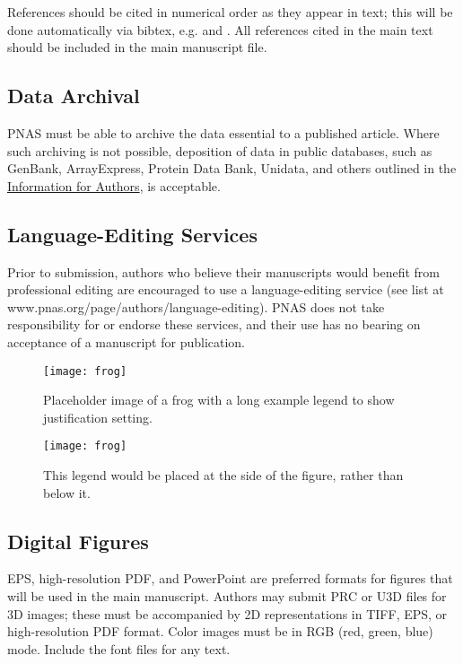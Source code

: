 \documentclass[9pt,twocolumn,twoside,lineno]{pnas-new}
\begin{document}
References should be cited in numerical order as they appear in text; this will be done automatically via bibtex, e.g. \cite{belkin2002using} and \cite{berard1994embedding,coifman2005geometric}. All references cited in the main text should be included in the main manuscript file.

\subsection*{Data Archival}

PNAS must be able to archive the data essential to a published article. Where such archiving is not possible, deposition of data in public databases, such as GenBank, ArrayExpress, Protein Data Bank, Unidata, and others outlined in the \href{https://www.pnas.org/page/authors/journal-policies#xi}{Information for Authors}, is acceptable.

\subsection*{Language-Editing Services}
Prior to submission, authors who believe their manuscripts would benefit from professional editing are encouraged to use a language-editing service (see list at www.pnas.org/page/authors/language-editing). PNAS does not take responsibility for or endorse these services, and their use has no bearing on acceptance of a manuscript for publication. 

\begin{figure}%
\centering
\texttt{[image: frog]}
\caption{Placeholder image of a frog with a long example legend to show justification setting.}
\label{fig:frog}
\end{figure}


\begin{SCfigure*}[\sidecaptionrelwidth][t]
\centering
\texttt{[image: frog]}
\caption{This legend would be placed at the side of the figure, rather than below it.}\label{fig:side}
\end{SCfigure*}

\subsection*{Digital Figures}

EPS, high-resolution PDF, and PowerPoint are preferred formats for figures that will be used in the main manuscript. Authors may submit PRC or U3D files for 3D images; these must be accompanied by 2D representations in TIFF, EPS, or high-resolution PDF format. Color images must be in RGB (red, green, blue) mode. Include the font files for any text.
\end{document}
